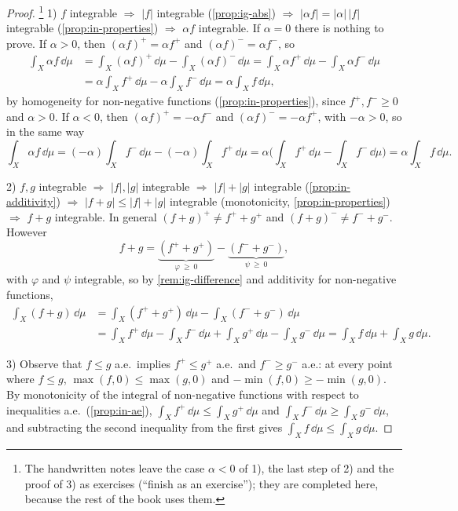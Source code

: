 \begin{proof}\footnote{The handwritten notes leave the case $\alpha<0$ of 1), the last step of
2) and the proof of 3) as exercises (``finish as an exercise''); they are completed here,
because the rest of the book uses them.}
1) $f$ integrable $\Rightarrow$ $|f|$ integrable (\cref{prop:ig-abs}) $\Rightarrow$
$|\alpha f|=|\alpha|\,|f|$ integrable (\cref{prop:in-properties}) $\Rightarrow$ $\alpha f$
integrable. If $\alpha=0$ there is nothing to prove. If $\alpha>0$, then $(\alpha f)^+=\alpha f^+$
and $(\alpha f)^-=\alpha f^-$, so
\begin{align*}
  \int_X\alpha f\,\dd\mu&=\int_X(\alpha f)^+\,\dd\mu-\int_X(\alpha f)^-\,\dd\mu
  =\int_X\alpha f^+\,\dd\mu-\int_X\alpha f^-\,\dd\mu\\
  &=\alpha\int_Xf^+\,\dd\mu-\alpha\int_Xf^-\,\dd\mu=\alpha\int_Xf\,\dd\mu,
\end{align*}
by homogeneity for non-negative functions (\cref{prop:in-properties}), since $f^+,f^-\ge0$ and
$\alpha>0$. If $\alpha<0$, then $(\alpha f)^+=-\alpha f^-$ and $(\alpha f)^-=-\alpha f^+$, with
$-\alpha>0$, so in the same way
\[
  \int_X\alpha f\,\dd\mu=(-\alpha)\int_Xf^-\,\dd\mu-(-\alpha)\int_Xf^+\,\dd\mu
  =\alpha\Big(\int_Xf^+\,\dd\mu-\int_Xf^-\,\dd\mu\Big)=\alpha\int_Xf\,\dd\mu .
\]

2) $f,g$ integrable $\Rightarrow$ $|f|,|g|$ integrable $\Rightarrow$ $|f|+|g|$ integrable
(\cref{prop:in-additivity}) $\Rightarrow$ $|f+g|\le|f|+|g|$ integrable (monotonicity,
\cref{prop:in-properties}) $\Rightarrow$ $f+g$ integrable. In general
$(f+g)^+\ne f^++g^+$ and $(f+g)^-\ne f^-+g^-$. However
\[
  f+g=\underbrace{(f^++g^+)}_{\varphi\ \ge\ 0}-\underbrace{(f^-+g^-)}_{\psi\ \ge\ 0},
\]
with $\varphi$ and $\psi$ integrable, so by \cref{rem:ig-difference} and additivity for
non-negative functions,
\begin{align*}
  \int_X(f+g)\,\dd\mu&=\int_X(f^++g^+)\,\dd\mu-\int_X(f^-+g^-)\,\dd\mu\\
  &=\int_Xf^+\,\dd\mu-\int_Xf^-\,\dd\mu+\int_Xg^+\,\dd\mu-\int_Xg^-\,\dd\mu
  =\int_Xf\,\dd\mu+\int_Xg\,\dd\mu .
\end{align*}

3) Observe that $f\le g$ a.e.\ implies $f^+\le g^+$ a.e.\ and $f^-\ge g^-$ a.e.: at every point
where $f\le g$, $\max(f,0)\le\max(g,0)$ and $-\min(f,0)\ge-\min(g,0)$. By monotonicity of the
integral of non-negative functions with respect to inequalities a.e.\ (\cref{prop:in-ae}),
$\int_Xf^+\,\dd\mu\le\int_Xg^+\,\dd\mu$ and $\int_Xf^-\,\dd\mu\ge\int_Xg^-\,\dd\mu$, and
subtracting the second inequality from the first gives $\int_Xf\,\dd\mu\le\int_Xg\,\dd\mu$.
\end{proof}

